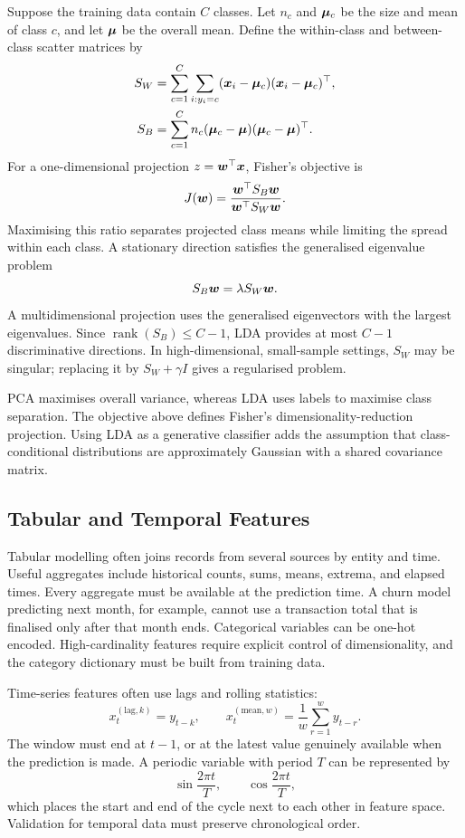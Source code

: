 Suppose the training data contain $C$ classes. Let $n_c$ and $\bm{\mu}_c$ be the size and mean of class $c$, and let $\bm{\mu}$ be the overall mean. Define the within-class and between-class scatter matrices by
\begin{align*}
  S_W
  &=\sum_{c=1}^{C}
    \sum_{i:y_i=c}
      (\bm{x}_i-\bm{\mu}_c)
      (\bm{x}_i-\bm{\mu}_c)^{\top},\\
  S_B
  &=\sum_{c=1}^{C}
    n_c(\bm{\mu}_c-\bm{\mu})
       (\bm{\mu}_c-\bm{\mu})^{\top}.
\end{align*}
For a one-dimensional projection $z=\bm{w}^{\top}\bm{x}$, Fisher's objective is
\[
  J(\bm{w})
  =\frac{\bm{w}^{\top}S_B\bm{w}}
         {\bm{w}^{\top}S_W\bm{w}}.
\]
Maximising this ratio separates projected class means while limiting the spread within each class. A stationary direction satisfies the generalised eigenvalue problem
\[
  S_B\bm{w}=\lambda S_W\bm{w}.
\]
A multidimensional projection uses the generalised eigenvectors with the largest eigenvalues. Since $\operatorname{rank}(S_B)\leq C-1$, LDA provides at most $C-1$ discriminative directions. In high-dimensional, small-sample settings, $S_W$ may be singular; replacing it by $S_W+\gamma I$ gives a regularised problem.

PCA maximises overall variance, whereas LDA uses labels to maximise class separation. The objective above defines Fisher's dimensionality-reduction projection. Using LDA as a generative classifier adds the assumption that class-conditional distributions are approximately Gaussian with a shared covariance matrix.

\PcaLdaFigure

\subsection{Tabular and Temporal Features}

Tabular modelling often joins records from several sources by entity and time. Useful aggregates include historical counts, sums, means, extrema, and elapsed times. Every aggregate must be available at the prediction time. A churn model predicting next month, for example, cannot use a transaction total that is finalised only after that month ends. Categorical variables can be one-hot encoded. High-cardinality features require explicit control of dimensionality, and the category dictionary must be built from training data.

Time-series features often use lags and rolling statistics:
\[
  x_t^{(\mathrm{lag},k)}=y_{t-k},
  \qquad
  x_t^{(\mathrm{mean},w)}
  =\frac1w\sum_{r=1}^{w}y_{t-r}.
\]
The window must end at $t-1$, or at the latest value genuinely available when the prediction is made. A periodic variable with period $T$ can be represented by
\[
  \sin\frac{2\pi t}{T},
  \qquad
  \cos\frac{2\pi t}{T},
\]
which places the start and end of the cycle next to each other in feature space. Validation for temporal data must preserve chronological order.

